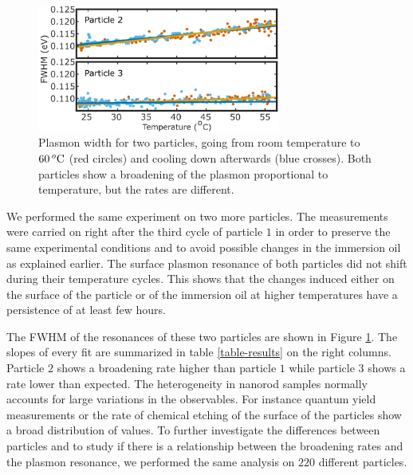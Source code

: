 \begin{figure}[tp] \centering 
\includegraphics[width=8cm]{Chapters/05_WhiteLight/Figures/03_Two_Pcles/03_Two_Pcles.png}
\caption{Plasmon width for two particles, 
going from room temperature to $60\,^o\textrm{C}$ (red circles) and cooling down
afterwards (blue crosses). Both particles show a broadening of the plasmon
proportional to temperature, but the rates are different.}	
\label{fig:two_pcles}
\end{figure}

We performed the same experiment on two more particles. The measurements were
carried on right after the third cycle of particle $1$ in order to preserve the
same experimental conditions and to avoid possible changes in the immersion oil
as explained earlier. The surface plasmon resonance of both particles did not
shift during their temperature cycles. This shows that the changes induced
either on the surface of the particle or of the immersion oil at higher
temperatures have a persistence of at least few hours.

The FWHM of the resonances of these two particles are shown in Figure
\ref{fig:two_pcles}. The slopes of every fit are summarized in table
\ref{table-results} on the right columns. Particle $2$ shows a broadening rate
higher than particle $1$ while particle $3$ shows a rate lower than expected.
The heterogeneity in nanorod samples normally accounts for large variations in
the observables. For instance quantum yield measurements\cite{Yorulmaz2012} or
the rate of chemical etching\cite{Carattino2016} of the surface of the particles
show a broad distribution of values. To further investigate the differences
between particles and to study if there is a relationship between the broadening
rates and the plasmon resonance, we performed the same analysis on $220$
different particles.


